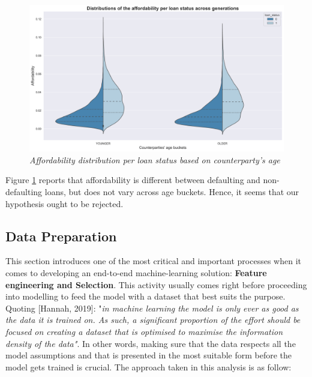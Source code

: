 \documentclass[a4paper,12pt]{article}
\begin{document}
        \begin{figure}[H]
            \centerline{
                \includegraphics[width=\linewidth]{./images/loans_affordability_status_age.png}
            }
            \caption{\textit{Affordability distribution per loan status based on counterparty's age}}
            \label{fig:loans_affordability_status_age}
        \end{figure}

    Figure \ref{fig:loans_affordability_status_age} reports that affordability is different 
    between defaulting and non-defaulting loans, but does not vary across age buckets. 
    Hence, it seems that our hypothesis ought to be rejected.

    \subsection[]{Data Preparation}
    \label{sec:data_preparation}

    This section introduces one of the most critical and important processes when it comes to 
    developing an end-to-end machine-learning solution: \textbf{Feature engineering and Selection}. 
    This activity usually comes right before proceeding into modelling to feed the model with a 
    dataset that best suits the purpose.  Quoting [Hannah, 2019]: 
    "\textit{in machine learning the model is only ever as good as the data it is trained on. 
    As such, a significant proportion of the effort should be focused on creating 
    a dataset that is optimised to maximise the information density of the data"}. 
    In other words, making sure that the data respects all the model assumptions and 
    that is presented in the most suitable form before the model gets trained is crucial. 
    The approach taken in this analysis is as follow:
\end{document}
